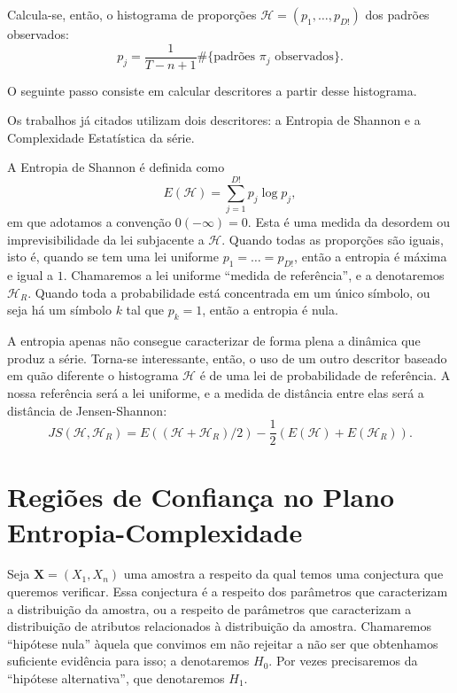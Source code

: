 Calcula-se, então, o histograma de proporções $\mathcal{H} =(p_1,\dots,p_{D!})$ dos padrões observados:
$$
p_j = \frac{1}{T-n+1} \# \{
\text{padrões } \pi_j \text{ observados}
\}.
$$

O seguinte passo consiste em calcular descritores a partir desse histograma.

Os trabalhos já citados utilizam dois descritores: a Entropia de Shannon e a Complexidade Estatística da série.

A Entropia de Shannon é definida como
$$
E(\mathcal H) = \sum_{j=1}^{D!} p_j \log p_j,
$$
em que adotamos a convenção $0(-\infty)=0$.
Esta é uma medida da desordem ou imprevisibilidade da lei subjacente a $\mathcal H$.
Quando todas as proporções são iguais, isto é, quando se tem uma lei uniforme $p_1=\dots=p_{D!}$, então a entropia é máxima e igual a $1$.
Chamaremos a lei uniforme ``medida de referência'', e a denotaremos $\mathcal H_R$.
Quando toda a probabilidade está concentrada em um único símbolo, ou seja há um símbolo $k$ tal que $p_k=1$, então a entropia é nula.

A entropia apenas não consegue caracterizar de forma plena a dinâmica que produz a série.
Torna-se interessante, então, o uso de um outro descritor baseado em quão diferente o histograma $\mathcal H$ é de uma lei de probabilidade de referência.
A nossa referência será a lei uniforme, e a medida de distância entre elas será a distância de Jensen-Shannon:
$$
JS(\mathcal H, \mathcal H_R) = E((\mathcal H+ \mathcal H_R)/2) -\frac{1}{2}(E(\mathcal H) + E(\mathcal H_R)).
$$



\section{Regiões de Confiança no Plano Entropia-Complexidade}

Seja $\bm X = (X_1, X_n)$ uma amostra a respeito da qual temos uma conjectura que queremos verificar.
Essa conjectura é a respeito dos parâmetros que caracterizam a distribuição da amostra, ou a respeito de parâmetros que caracterizam a distribuição de atributos relacionados à distribuição da amostra.
Chamaremos ``hipótese nula'' àquela que convimos em não rejeitar a não ser que obtenhamos suficiente evidência para isso; a denotaremos $H_0$.
Por vezes precisaremos da ``hipótese alternativa'', que denotaremos $H_1$.


